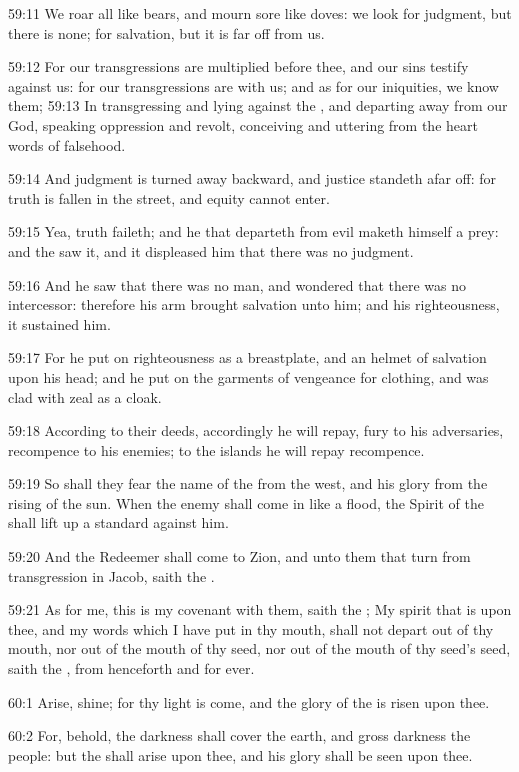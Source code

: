 59:11 We roar all like bears, and mourn sore like doves: we look for judgment, but there is none; for salvation, but it is far off from us.

59:12 For our transgressions are multiplied before thee, and our sins testify against us: for our transgressions are with us; and as for our iniquities, we know them; 59:13 In transgressing and lying against the \LORD, and departing away from our God, speaking oppression and revolt, conceiving and uttering from the heart words of falsehood.

59:14 And judgment is turned away backward, and justice standeth afar off: for truth is fallen in the street, and equity cannot enter.

59:15 Yea, truth faileth; and he that departeth from evil maketh himself a prey: and the \LORD saw it, and it displeased him that there was no judgment.

59:16 And he saw that there was no man, and wondered that there was no intercessor: therefore his arm brought salvation unto him; and his righteousness, it sustained him.

59:17 For he put on righteousness as a breastplate, and an helmet of salvation upon his head; and he put on the garments of vengeance for clothing, and was clad with zeal as a cloak.

59:18 According to their deeds, accordingly he will repay, fury to his adversaries, recompence to his enemies; to the islands he will repay recompence.

59:19 So shall they fear the name of the \LORD from the west, and his glory from the rising of the sun. When the enemy shall come in like a flood, the Spirit of the \LORD shall lift up a standard against him.

59:20 And the Redeemer shall come to Zion, and unto them that turn from transgression in Jacob, saith the \LORD.

59:21 As for me, this is my covenant with them, saith the \LORD; My spirit that is upon thee, and my words which I have put in thy mouth, shall not depart out of thy mouth, nor out of the mouth of thy seed, nor out of the mouth of thy seed's seed, saith the \LORD, from henceforth and for ever.

60:1 Arise, shine; for thy light is come, and the glory of the \LORD is risen upon thee.

60:2 For, behold, the darkness shall cover the earth, and gross darkness the people: but the \LORD shall arise upon thee, and his glory shall be seen upon thee.

